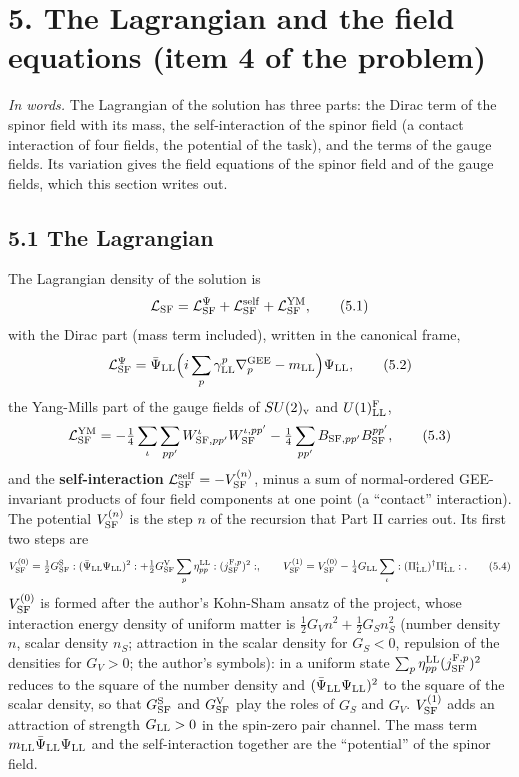 \documentclass[
  10pt,
]{article}
\begin{document}
\hypertarget{the-lagrangian-and-the-field-equations-item-4-of-the-problem}{%
\section{5. The Lagrangian and the field equations (item 4 of the
problem)}\label{the-lagrangian-and-the-field-equations-item-4-of-the-problem}}

\emph{In words.} The Lagrangian of the solution has three parts: the
Dirac term of the spinor field with its mass, the self-interaction of
the spinor field (a contact interaction of four fields, the potential of
the task), and the terms of the gauge fields. Its variation gives the
field equations of the spinor field and of the gauge fields, which this
section writes out.

\hypertarget{the-lagrangian}{%
\subsection{5.1 The Lagrangian}\label{the-lagrangian}}

The Lagrangian density of the solution is
\[\mathcal L_{\rm SF}=\mathcal L^\Psi_{\rm SF}+\mathcal L^{\rm self}_{\rm SF}+\mathcal L^{\rm YM}_{\rm SF},\tag{5.1}\]
with the Dirac part (mass term included), written in the canonical
frame,
\[\mathcal L^\Psi_{\rm SF}=\bar\Psi_{\rm LL}\Big(i\sum_p\gamma^p_{\rm LL}\nabla^{\rm GEE}_p-m_{\rm LL}\Big)\Psi_{\rm LL},\tag{5.2}\]
the Yang-Mills part of the gauge fields of \(SU(2)_{\rm v}\) and
\(U(1)^{\rm F}_{\rm LL}\),
\[\mathcal L^{\rm YM}_{\rm SF}=-\tfrac14\sum_{\iota}\sum_{pp'}W^\iota_{{\rm SF},pp'}W^{\iota,pp'}_{\rm SF}-\tfrac14\sum_{pp'}B_{{\rm SF},pp'}B^{pp'}_{\rm SF},\tag{5.3}\]
and the \textbf{self-interaction}
\(\mathcal L^{\rm self}_{\rm SF}=-V^{(n)}_{\rm SF}\), minus a sum of
normal-ordered GEE-invariant products of four field components at one
point (a ``contact'' interaction). The potential \(V^{(n)}_{\rm SF}\) is
the step \(n\) of the recursion that Part II carries out. Its first two
steps are
\[V^{(0)}_{\rm SF}=\tfrac12G^{\rm S}_{\rm SF}:(\bar\Psi_{\rm LL}\Psi_{\rm LL})^2:+\tfrac12G^{\rm V}_{\rm SF}\sum_p\eta^{\rm LL}_{pp}:(j^{{\rm F},p}_{\rm SF})^2:,\qquad V^{(1)}_{\rm SF}=V^{(0)}_{\rm SF}-\tfrac14G_{\rm LL}\sum_\iota:(\Pi^\iota_{\rm LL})^\dagger\Pi^\iota_{\rm LL}:.\tag{5.4}\]
\(V^{(0)}_{\rm SF}\) is formed after the author's Kohn-Sham ansatz of
the project, whose interaction energy density of uniform matter is
\(\tfrac12G_Vn^2+\tfrac12G_Sn_S^2\) (number density \(n\), scalar
density \(n_S\); attraction in the scalar density for \(G_S<0\),
repulsion of the densities for \(G_V>0\); the author's symbols): in a
uniform state \(\sum_p\eta^{\rm LL}_{pp}(j^{{\rm F},p}_{\rm SF})^2\)
reduces to the square of the number density and
\((\bar\Psi_{\rm LL}\Psi_{\rm LL})^2\) to the square of the scalar
density, so that \(G^{\rm S}_{\rm SF}\) and \(G^{\rm V}_{\rm SF}\) play
the roles of \(G_S\) and \(G_V\). \(V^{(1)}_{\rm SF}\) adds an
attraction of strength \(G_{\rm LL}>0\) in the spin-zero pair channel.
The mass term \(m_{\rm LL}\bar\Psi_{\rm LL}\Psi_{\rm LL}\) and the
self-interaction together are the ``potential'' of the spinor field.
\end{document}
